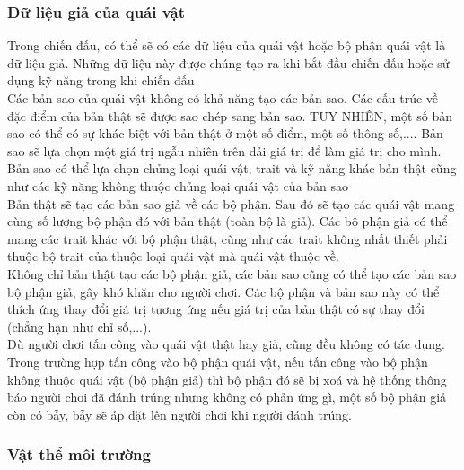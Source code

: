 \subsubsection{Dữ liệu giả của quái vật}
\hspace*{0.5cm} Trong chiến đấu, có thể sẽ có các dữ liệu của quái vật hoặc bộ phận quái vật là dữ liệu giả. Những dữ liệu này được chúng tạo ra khi bắt đầu chiến đấu hoặc sử dụng kỹ năng trong khi chiến đấu\\
\hspace*{0.5cm} Các bản sao của quái vật không có khả năng tạo các bản sao. Các cấu trúc về đặc điểm của bản thật sẽ được sao chép sang bản sao. TUY NHIÊN, một số bản sao có thể có sự khác biệt với bản thật ở một số điểm, một số thông số,.... Bản sao sẽ lựa chọn một giá trị ngẫu nhiên trên dải giá trị để làm giá trị cho mình. Bản sao có thể lựa chọn chủng loại quái vật, trait và kỹ năng khác bản thật cũng như các kỹ năng không thuộc chủng loại quái vật của bản sao\\
\hspace*{0.5cm} Bản thật sẽ tạo các bản sao giả về các bộ phận. Sau đó sẽ tạo các quái vật mang cùng số lượng bộ phận đó với bản thật (toàn bộ là giả). Các bộ phận giả có thể mang các trait khác với bộ phận thật, cũng như các trait không nhất thiết phải thuộc bộ trait của thuộc loại quái vật mà quái vật thuộc về. \\
\hspace*{0.5cm} Không chỉ bản thật tạo các bộ phận giả, các bản sao cũng có thể tạo các bản sao bộ phận giả, gây khó khăn cho người chơi. Các bộ phận và bản sao này có thể thích ứng thay đổi giá trị tương ứng nếu giá trị của bản thật có sự thay đổi (chẳng hạn như chỉ số,...). \\
\hspace*{0.5cm} Dù người chơi tấn công vào quái vật thật hay giả, cũng đều không có tác dụng. Trong trường hợp tấn công vào bộ phận quái vật, nếu tấn công vào bộ phận không thuộc quái vật (bộ phận giả) thì bộ phận đó sẽ bị xoá và hệ thống thông báo người chơi đã đánh trúng nhưng không có phản ứng gì, một số bộ phận giả còn có bẫy, bẫy sẽ áp đặt lên người chơi khi người đánh trúng.\\

\subsubsection{Vật thể môi trường}

